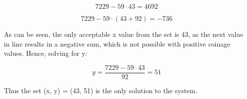 \begin{enumerate}
\begin{equation}
    7229 - 59 \cdot 43 = 4692
\end{equation}

\begin{equation}
    7229 - 59 \cdot (43 + 92) = -736
\end{equation}

As can be seen, the only acceptable x value from the set is 43, as the next value in line results in a negative sum, which is not possible with positive coinage values. Hence, solving for y:

\begin{equation}
    y = \frac{7229 - 59 \cdot 43}{92} = 51
\end{equation}

Thus the set (x, y) = (43, 51) is the only solution to the system.

\end{enumerate}
